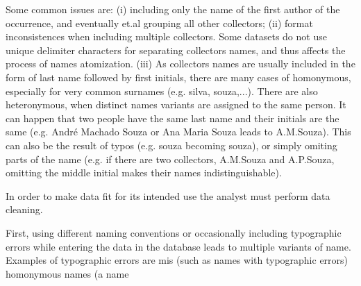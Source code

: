 Some common issues are: (i) including only the name of the first author of the occurrence, and eventually et.al grouping all other collectors;
(ii) format inconsistences when including multiple collectors. Some datasets do not use unique delimiter characters for separating collectors names, and thus affects the process of names atomization.
(iii) As collectors names are usually included in the form of last name followed by first initials, there are many cases of homonymous, especially for very common surnames (e.g. silva, souza,...).
There are also heteronymous, when distinct names variants are assigned to the same person. It can happen that two people have the same last name and their initials are the same (e.g. André Machado Souza or Ana Maria Souza leads to A.M.Souza).
This can also be the result of typos (e.g. souza becoming souza), or simply omiting parts of the name (e.g. if there are two collectors, A.M.Souza and A.P.Souza, omitting the middle initial makes their names indistinguishable).


In order to make data fit for its intended use the analyst must perform data cleaning.




















First, using different naming conventions or occasionally including typographic errors while entering the data in the database leads to multiple variants of name.
Examples of typographic errors are mis
(such as names with typographic errors) homonymous names (a name
